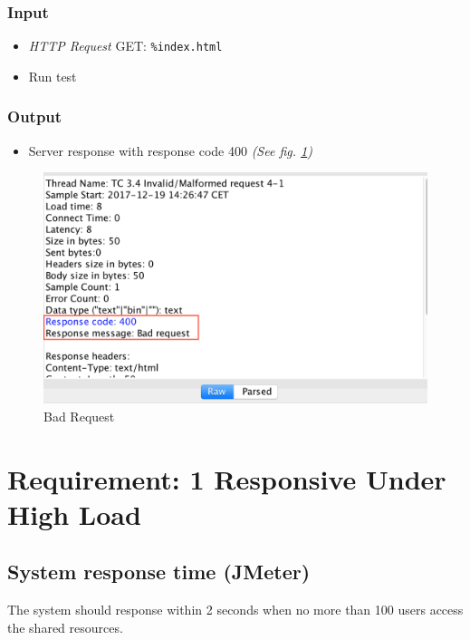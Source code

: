 \documentclass[a4paper, 12pt]{article}
\begin{document}
\subsubsection{Input}
\begin{itemize}
\item \textit{HTTP Request} GET: \texttt{\%index.html}
\item Run test
\end{itemize}

\subsubsection{Output}
\begin{itemize}
\item Server response with response code 400 \textit{(See fig. \ref{TC3.4})}
\end{itemize}

\begin{figure}[H]
\includegraphics[scale=0.7]{output_clarification/400BADREQUEST.png} 
\caption{Bad Request}
\label{TC3.4}
\end{figure}

\newpage
\section{Requirement: 1 Responsive Under High Load}

\subsection{System response time (JMeter)}

The system should response within 2 seconds when no more than 100 users access the shared resources.
\end{document}
